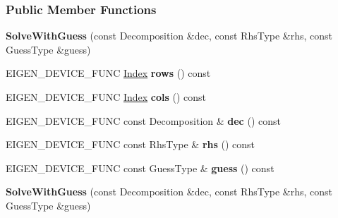 \subsubsection*{Public Member Functions}
\begin{DoxyCompactItemize}
\item 
\mbox{\label{group___iterative_linear_solvers___module_ae703bda1fcae1dc8d60078fdd4a8ca06}} 
{\bfseries Solve\+With\+Guess} (const Decomposition \&dec, const Rhs\+Type \&rhs, const Guess\+Type \&guess)
\item 
\mbox{\label{group___iterative_linear_solvers___module_a24d826dd09bb375a5a171a4d7fea7238}} 
E\+I\+G\+E\+N\+\_\+\+D\+E\+V\+I\+C\+E\+\_\+\+F\+U\+NC \hyperlink{namespace_eigen_a62e77e0933482dafde8fe197d9a2cfde}{Index} {\bfseries rows} () const
\item 
\mbox{\label{group___iterative_linear_solvers___module_a8e557813e4cd841435a4004adc39ac58}} 
E\+I\+G\+E\+N\+\_\+\+D\+E\+V\+I\+C\+E\+\_\+\+F\+U\+NC \hyperlink{namespace_eigen_a62e77e0933482dafde8fe197d9a2cfde}{Index} {\bfseries cols} () const
\item 
\mbox{\label{group___iterative_linear_solvers___module_a1b6c66f5ae7156005a1d9c3034cabc88}} 
E\+I\+G\+E\+N\+\_\+\+D\+E\+V\+I\+C\+E\+\_\+\+F\+U\+NC const Decomposition \& {\bfseries dec} () const
\item 
\mbox{\label{group___iterative_linear_solvers___module_a4f67d806525d7a0468d3128fc6a14610}} 
E\+I\+G\+E\+N\+\_\+\+D\+E\+V\+I\+C\+E\+\_\+\+F\+U\+NC const Rhs\+Type \& {\bfseries rhs} () const
\item 
\mbox{\label{group___iterative_linear_solvers___module_a8192fcb557b83ddbf9a78783eeb931c1}} 
E\+I\+G\+E\+N\+\_\+\+D\+E\+V\+I\+C\+E\+\_\+\+F\+U\+NC const Guess\+Type \& {\bfseries guess} () const
\item 
\mbox{\label{group___iterative_linear_solvers___module_ae703bda1fcae1dc8d60078fdd4a8ca06}} 
{\bfseries Solve\+With\+Guess} (const Decomposition \&dec, const Rhs\+Type \&rhs, const Guess\+Type \&guess)

\end{DoxyCompactItemize}
